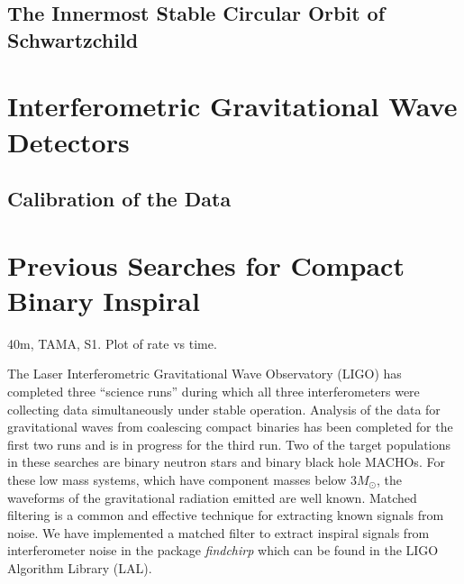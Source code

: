 \subsection{The Innermost Stable Circular Orbit of Schwartzchild}

\section{Interferometric Gravitational Wave Detectors}

\subsection{Calibration of the Data}
\label{ss:calibration}

\section{Previous Searches for Compact Binary Inspiral}

40m, TAMA, S1. Plot of rate vs time.


The Laser Interferometric Gravitational Wave Observatory (LIGO)\cite{barish}
has completed three ``science runs'' during which all three interferometers
were collecting data simultaneously under stable operation. Analysis of the
data for gravitational waves from coalescing compact binaries has been
completed for the first two runs\cite{bns1,bns2,macho} and is in progress for
the third run. Two of the target populations in these searches are binary
neutron stars\cite{300yrs} and binary black hole
MACHOs\cite{sammacho,nakamura}. For these low mass systems, which have
component masses below $3 M_\odot$, the waveforms of the gravitational
radiation emitted are well known\cite{bdiww,biww}.  Matched filtering is a
common and effective technique for extracting known signals from
noise\cite{wz}. We have implemented a matched filter to extract inspiral
signals from interferometer noise in the package \emph{findchirp} which can be
found in the LIGO Algorithm Library (LAL)\cite{lal}.



